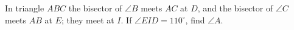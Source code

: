 In triangle $ABC$ the bisector of $\angle B$ meets $AC$ at $D$, and the bisector of $\angle C$ meets $AB$ at $E$; they meet at $I$. If $\angle EID=110^\circ$, find $\angle A$.
